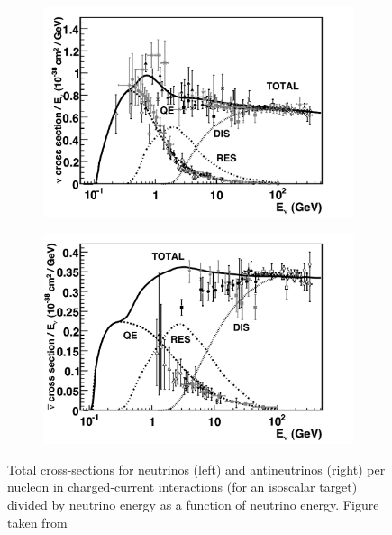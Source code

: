 \begin{figure}[h!]
        \begin{subfigure}[h]{0.7\textwidth}
            \includegraphics{./figures/nu_phenomenology/cc_inclusive_nu.pdf}
        \end{subfigure}
        \hfill
        \begin{subfigure}[h]{0.7\textwidth}
            \includegraphics{./figures/nu_phenomenology/cc_inclusive_nubar.pdf}
        \end{subfigure}
        
        \caption{Total cross-sections for neutrinos (left) and antineutrinos (right) per nucleon in charged-current interactions (for an isoscalar target) divided by neutrino energy as a function of neutrino energy. Figure taken from \cite{xsec_overview} }
\end{figure}

